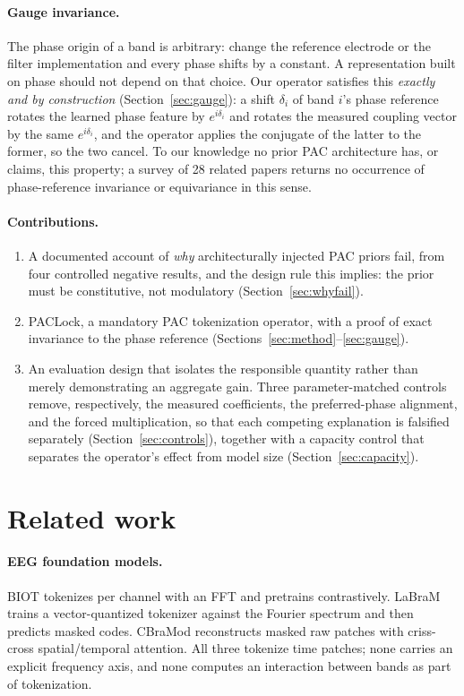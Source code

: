 \documentclass{article}
\begin{document}
\paragraph{Gauge invariance.}
The phase origin of a band is arbitrary: change the reference electrode or the
filter implementation and every phase shifts by a constant. A representation
built on phase should not depend on that choice. Our operator satisfies this
\emph{exactly and by construction} (Section~\ref{sec:gauge}): a shift $\delta_i$
of band $i$'s phase reference rotates the learned phase feature by
$e^{i\delta_i}$ and rotates the measured coupling vector by the same
$e^{i\delta_i}$, and the operator applies the conjugate of the latter to the
former, so the two cancel. To our knowledge no prior PAC architecture has, or
claims, this property; a survey of 28 related papers returns no occurrence of
phase-reference invariance or equivariance in this sense.

\paragraph{Contributions.}
\begin{enumerate}
\item A documented account of \emph{why} architecturally injected PAC priors
fail, from four controlled negative results, and the design rule this implies:
the prior must be constitutive, not modulatory (Section~\ref{sec:whyfail}).
\item {\sc PACLock}, a mandatory PAC tokenization operator, with a proof of exact
invariance to the phase reference (Sections~\ref{sec:method}--\ref{sec:gauge}).
\item An evaluation design that isolates the responsible quantity rather than
merely demonstrating an aggregate gain. Three parameter-matched controls remove,
respectively, the measured coefficients, the preferred-phase alignment, and the
forced multiplication, so that each competing explanation is falsified separately
(Section~\ref{sec:controls}), together with a capacity control that separates the
operator's effect from model size (Section~\ref{sec:capacity}).
\end{enumerate}

\section{Related work}

\paragraph{EEG foundation models.}
BIOT \citep{yang2023biot} tokenizes per channel with an FFT and pretrains
contrastively. LaBraM \citep{jiang2024labram} trains a vector-quantized tokenizer
against the Fourier spectrum and then predicts masked codes. CBraMod
\citep{wang2025cbramod} reconstructs masked raw patches with criss-cross
spatial/temporal attention. All three tokenize time patches; none carries an
explicit frequency axis, and none computes an interaction between bands as part
of tokenization.
\end{document}
